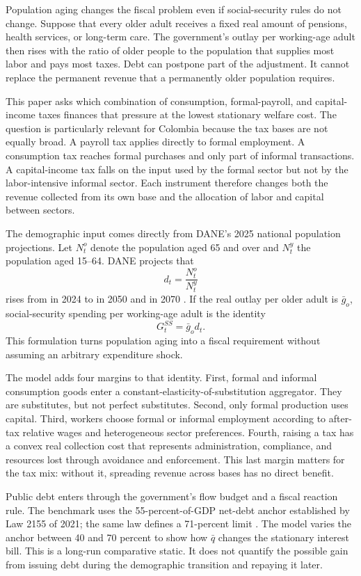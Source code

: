 \documentclass[12pt]{article}
\begin{document}
Population aging changes the fiscal problem even if social-security rules do
not change. Suppose that every older adult receives a fixed real amount of
pensions, health services, or long-term care. The government's outlay per
working-age adult then rises with the ratio of older people to the population
that supplies most labor and pays most taxes. Debt can postpone part of the
adjustment. It cannot replace the permanent revenue that a permanently older
population requires.

This paper asks which combination of consumption, formal-payroll, and
capital-income taxes finances that pressure at the lowest stationary welfare
cost. The question is particularly relevant for Colombia because the tax
bases are not equally broad. A payroll tax applies directly to formal
employment. A consumption tax reaches formal purchases and only part of
informal transactions. A capital-income tax falls on the input used by the
formal sector but not by the labor-intensive informal sector. Each instrument
therefore changes both the revenue collected from its own base and the
allocation of labor and capital between sectors.

The demographic input comes directly from DANE's 2025 national population
projections. Let $N_t^o$ denote the population aged 65 and over and $N_t^y$
the population aged 15--64. DANE projects that
\[
 d_t=\frac{N_t^o}{N_t^y}
\]
rises from \DependencyTwentyTwentyFour{} in 2024 to
\DependencyTwentyFifty{} in 2050 and \DependencyTwentySeventy{} in 2070
\citep{DANE2025Projections}. If the real outlay per older adult is
$\bar g_o$, social-security spending per working-age adult is the identity
\[
 G_t^{SS}=\bar g_o d_t.
\]
This formulation turns population aging into a fiscal requirement without
assuming an arbitrary expenditure shock.

The model adds four margins to that identity. First, formal and informal
consumption goods enter a constant-elasticity-of-substitution aggregator.
They are substitutes, but not perfect substitutes. Second, only formal
production uses capital. Third, workers choose formal or informal employment
according to after-tax relative wages and heterogeneous sector preferences.
Fourth, raising a tax has a convex real collection cost that represents
administration, compliance, and resources lost through avoidance and
enforcement. This last margin matters for the tax mix: without it, spreading
revenue across bases has no direct benefit.

Public debt enters through the government's flow budget and a fiscal reaction
rule. The benchmark uses the 55-percent-of-GDP net-debt anchor established by
Law 2155 of 2021; the same law defines a 71-percent limit
\citep{Law2155}. The model varies the anchor between 40 and 70 percent to show
how $\bar q$ changes the stationary interest bill. This is a long-run
comparative static. It does not quantify the possible gain from issuing debt
during the demographic transition and repaying it later.
\end{document}
